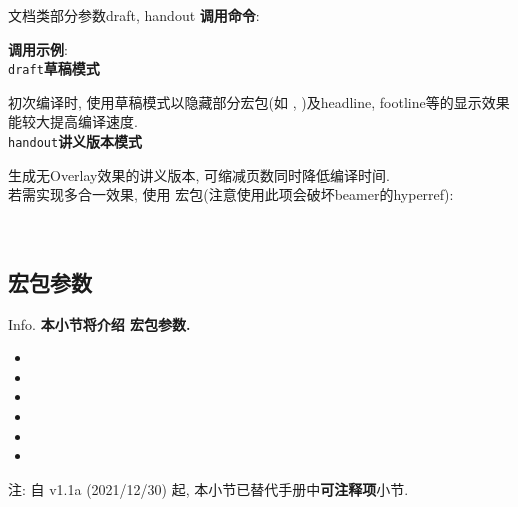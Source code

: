 \begin{frame}{文档类部分参数}{draft, handout}
	\textbf{调用命令}: 

  \textbf{调用示例}: \\

  \alert{\texttt{draft}}\hfill \textbf{草稿模式}

	初次编译时, 使用草稿模式以隐藏部分宏包(如 , )及headline, footline等的显示效果能较大提高编译速度.\\

	\alert{\texttt{handout}}\hfill \textbf{讲义版本模式}

	生成无Overlay效果的讲义版本, 可缩减页数同时降低编译时间.\\
	若需实现多合一效果, 使用  宏包(注意使用此项会破坏beamer的hyperref):
	\begin{center}
		\begin{minipage}{.8\textwidth}
			\raggedright
			\\
		\end{minipage}
	\end{center}
\end{frame}

\subsection{ 宏包参数}
\begin{frame}{Info.}
	\textbf{本小节将介绍  宏包参数.}
	\begin{multicols}{2}
		\begin{itemize}
			\item {}
			\item {}
			\item {}
			\item {}
			\item {}
			\item {}
		\end{itemize}
	\end{multicols}
	注: 自 \textcolor{scugreen}{v1.1a (2021/12/30)} 起, 本小节已替代手册中\alert{\textbf{可注释项}}小节.\par
	\mycopyright
\end{frame}


